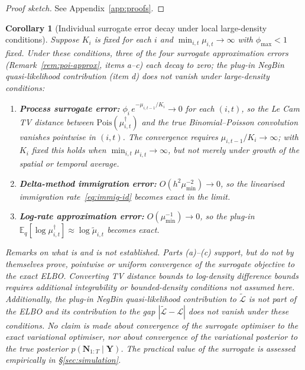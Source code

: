 \documentclass[review,12pt]{elsarticle}
\newtheorem{corollary}[theorem]{Corollary}
\theoremstyle{definition}
\begin{document}
\begin{proof}[Proof sketch]
See Appendix~\ref{app:proofs}.
\end{proof}

\begin{corollary}[Individual surrogate error decay under local large-density conditions]\label{cor:elbo-gap}
Suppose $K_i$ is fixed for each $i$ and $\min_{i,t}\mu_{i,t}\to\infty$
with $\phi_{\max}<1$ fixed.
Under these conditions, three of the four surrogate approximation
errors (Remark~\ref{rem:poi-approx}, items a--c) each decay to zero;
the plug-in NegBin quasi-likelihood contribution (item d) does not vanish
under large-density conditions:
\begin{enumerate}[label=(\alph*)]
\item \textbf{Process surrogate error:}
$\phi_i\,e^{-\mu_{i,t-1}/K_i}\to 0$ for each $(i,t)$, so the Le Cam TV
distance between $\mathrm{Pois}(\mu^\dagger_{i,t})$ and the true
Binomial--Poisson convolution vanishes pointwise in $(i,t)$.
The convergence requires $\mu_{i,t-1}/K_i\to\infty$; with $K_i$ fixed this
holds when $\min_{i,t}\mu_{i,t}\to\infty$, but not merely under growth of the
spatial or temporal average.
\item \textbf{Delta-method immigration error:}
$O(h^2\mu_{\min}^{-2})\to 0$, so the linearised immigration rate~\eqref{eq:immig-id}
becomes exact in the limit.
\item \textbf{Log-rate approximation error:}
$O(\mu_{\min}^{-1})\to 0$, so the plug-in
$\mathbb{E}_q[\log\mu^\dagger_{i,t}]\approx\log\tilde\mu_{i,t}$ becomes exact.
\end{enumerate}
\emph{Remarks on what is and is not established.}
Parts (a)--(c) support, but do not by themselves prove, pointwise or uniform
convergence of the surrogate objective to the exact ELBO.
Converting TV distance bounds to log-density difference bounds requires
additional integrability or bounded-density conditions not assumed here.
Additionally, the plug-in NegBin quasi-likelihood contribution to
$\tilde{\mathcal{L}}$ is not part of the ELBO and its contribution to the gap
$|\tilde{\mathcal{L}}-\mathcal{L}|$ does not vanish under these conditions.
No claim is made about convergence of the surrogate optimiser to the exact
variational optimiser, nor about convergence of the variational posterior to
the true posterior $p(\mathbf{N}_{1:T}\mid\mathbf{Y})$.  The practical value
of the surrogate is assessed empirically in \S\ref{sec:simulation}.
\end{corollary}
\end{document}
